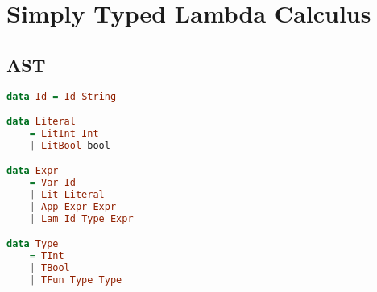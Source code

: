 \section{Simply Typed Lambda Calculus}
\subsection{AST}
\begin{lstlisting}[language=Haskell]
data Id = Id String

data Literal 
    = LitInt Int
    | LitBool bool

data Expr 
    = Var Id
    | Lit Literal
    | App Expr Expr
    | Lam Id Type Expr

data Type
    = TInt
    | TBool
    | TFun Type Type
\end{lstlisting}

